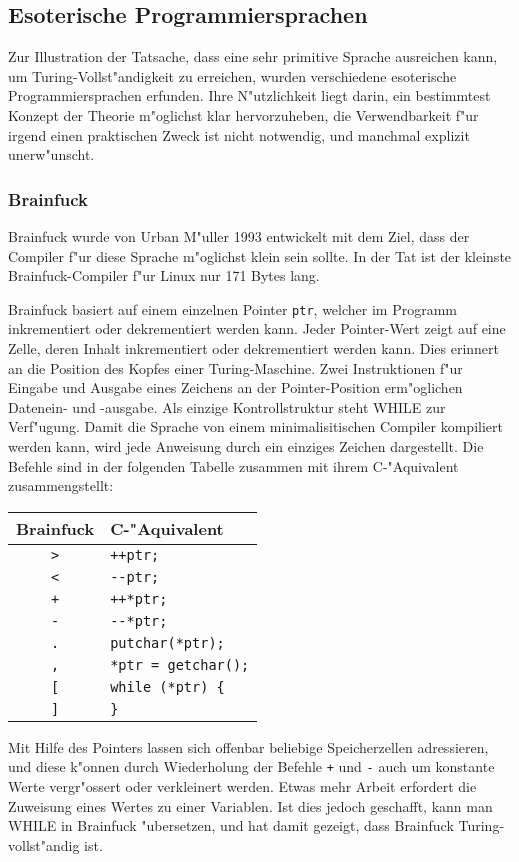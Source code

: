 \subsection{Esoterische Programmiersprachen}
Zur Illustration der Tatsache, dass eine sehr primitive Sprache 
ausreichen kann, um Turing-Vollst"andigkeit zu erreichen, wurden
verschiedene esoterische Programmiersprachen erfunden.
Ihre N"utzlichkeit liegt darin, ein bestimmtest Konzept der Theorie
m"oglichst klar hervorzuheben, die Verwendbarkeit f"ur irgend einen
praktischen Zweck ist nicht notwendig, und manchmal explizit unerw"unscht.

\subsubsection{Brainfuck}
Brainfuck
wurde von Urban M"uller 1993 entwickelt mit dem Ziel, dass der
Compiler f"ur diese Sprache m"oglichst klein sein sollte. In der
Tat ist der kleinste Brainfuck-Compiler f"ur Linux nur 171 Bytes
lang.

Brainfuck basiert auf einem einzelnen Pointer {\tt ptr}, welcher
im Programm inkrementiert oder dekrementiert werden kann. 
Jeder Pointer-Wert zeigt auf eine Zelle, deren Inhalt inkrementiert
oder dekrementiert werden kann.
Dies erinnert an die Position des Kopfes einer Turing-Maschine. 
Zwei Instruktionen f"ur Eingabe und Ausgabe eines Zeichens
an der Pointer-Position erm"oglichen Datenein- und -ausgabe.
Als einzige Kontrollstruktur steht WHILE zur Verf"ugung. Damit
die Sprache von einem minimalisitischen Compiler kompiliert
werden kann, wird jede Anweisung durch ein einziges Zeichen
dargestellt. Die Befehle sind in der folgenden Tabelle
zusammen mit ihrem C-"Aquivalent zusammengstellt:
\begin{center}
\begin{tabular}{|c|l|}
\hline
Brainfuck&C-"Aquivalent\\
\hline
{\tt >}&\verb/++ptr;/\\
{\tt <}&\verb/--ptr;/\\
{\tt +}&\verb/++*ptr;/\\
{\tt -}&\verb/--*ptr;/\\
{\tt .}&\verb/putchar(*ptr);/\\
{\tt ,}&\verb/*ptr = getchar();/\\
{\tt [}&\verb/while (*ptr) {/\\
{\tt ]}&\verb/}/\\
\hline
\end{tabular}
\end{center}
Mit Hilfe des Pointers lassen sich offenbar beliebige Speicherzellen
adressieren, und diese k"onnen durch Wiederholung der Befehle {\tt +}
und {\tt -} auch um konstante Werte vergr"ossert
oder verkleinert werden. Etwas mehr Arbeit erfordert die Zuweisung
eines Wertes zu einer Variablen. Ist dies jedoch geschafft, kann
man WHILE in Brainfuck "ubersetzen, und hat damit gezeigt, dass
Brainfuck Turing-vollst"andig ist.

